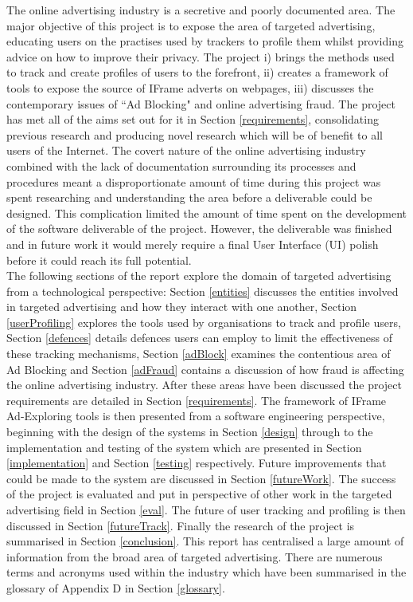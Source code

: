 \documentclass[12pt]{article}
\begin{document}
The online advertising industry is a secretive and poorly documented area. The major objective of this project is to expose the area of targeted advertising, educating users on the practises used by trackers to profile them whilst providing advice on how to improve their privacy. The project i) brings the methods used to track and create profiles of users to the forefront, ii) creates a framework of tools to expose the source of IFrame adverts on webpages, iii) discusses the contemporary issues of ``Ad Blocking" and online advertising fraud. The project has met all of the aims set out for it in Section \ref{requirements}, consolidating previous research and producing novel research which will be of benefit to all users of the Internet. The covert nature of the online advertising industry combined with the lack of documentation surrounding its processes and procedures meant a disproportionate amount of time during this project was spent researching and understanding the area before a deliverable could be designed. This complication limited the amount of time spent on the development of the software deliverable of the project. However, the deliverable was finished and in future work it would merely require a final User Interface (UI) polish before it could reach its full potential.   \\

The following sections of the report explore the domain of targeted advertising from a technological perspective: Section \ref{entities} discusses the entities involved in targeted advertising and how they interact with one another, Section \ref{userProfiling} explores the tools used by organisations to track and profile users, Section \ref{defences} details defences users can employ to limit the effectiveness of these tracking mechanisms, Section \ref{adBlock} examines the contentious area of Ad Blocking and Section \ref{adFraud} contains a discussion of how fraud is affecting the online advertising industry. After these areas have been discussed the project requirements are detailed in Section \ref{requirements}. The framework of IFrame Ad-Exploring tools is then presented from a software engineering perspective, beginning with the design of the systems in Section \ref{design} through to the implementation and testing of the system which are presented in Section \ref{implementation} and Section \ref{testing} respectively. Future improvements that could be made to the system are discussed in Section \ref{futureWork}. The success of the project is evaluated and put in perspective of other work in the targeted advertising field in Section \ref{eval}. The future of user tracking and profiling is then discussed in Section \ref{futureTrack}. Finally the research of the project is summarised in Section \ref{conclusion}. This report has centralised a large amount of information from the broad area of targeted advertising. There are numerous terms and acronyms used within the industry which have been summarised in the glossary of Appendix D in Section \ref{glossary}.  
\end{document}
